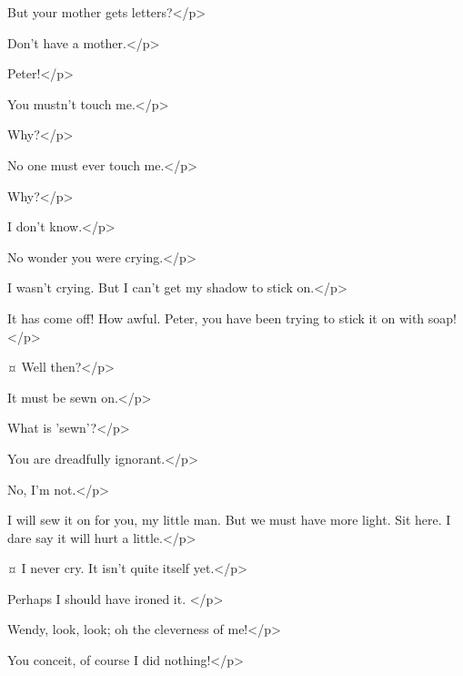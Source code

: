 \begin{drama}
\wendyspeaks
But your mother gets letters?</p>

\peterspeaks
Don't have a mother.</p>

\wendyspeaks
Peter!</p>


\peterspeaks
You mustn't touch me.</p>

\wendyspeaks
Why?</p>

\peterspeaks
No one must ever touch me.</p>

\wendyspeaks
Why?</p>

\peterspeaks
I don't know.</p>


\wendyspeaks
No wonder you were crying.</p>

\peterspeaks
I wasn't crying.
But I can't get my shadow to stick on.</p>

\wendyspeaks
It has come off!
How awful.
Peter, you have been trying to stick it on with soap!</p>

\peterspeaks {}¤
Well then?</p>

\wendyspeaks
It must be sewn on.</p>

\peterspeaks
What is 'sewn'?</p>

\wendyspeaks
You are dreadfully ignorant.</p>

\peterspeaks
No, I'm not.</p>

\wendyspeaks
I will sew it on for you, my little man.
But we must have more light.
Sit here.
I dare say it will hurt a little.</p>

\peterspeaks {}¤
I never cry.
It isn't quite itself yet.</p>

\wendyspeaks
Perhaps I should have ironed it.
</p>

\peterspeaks
Wendy, look, look; oh the cleverness of me!</p>

\wendyspeaks
You conceit, of course I did nothing!</p>


\end{drama}
